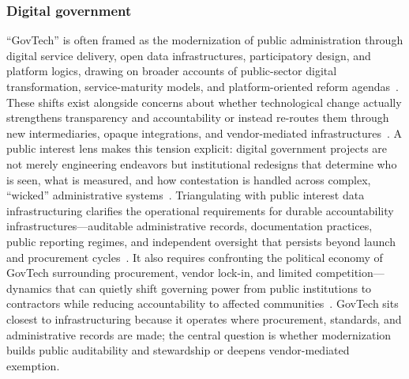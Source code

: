 \documentclass[acmsmall,screen]{acmart}
\begin{document}
\subsubsection*{Digital government}
``GovTech'' is often framed as the modernization of public administration through digital service delivery, open data infrastructures, participatory design, and platform logics, drawing on broader accounts of public-sector digital transformation, service-maturity models, and platform-oriented reform agendas~\cite{eomDigitalGovernmentTransformation2022,layneDevelopingFullyFunctional2001,brownAppraisingImpactRole2017}. These shifts exist alongside concerns about whether technological change actually strengthens transparency and accountability or instead re-routes them through new intermediaries, opaque integrations, and vendor-mediated infrastructures~\cite{bertotUsingICTsCreate2010,bharosaRiseGovTechTrojan2022,silvePoliticalEconomyGovTech2023}. A public interest lens makes this tension explicit: digital government projects are not merely engineering endeavors but institutional redesigns that determine who is seen, what is measured, and how contestation is handled across complex, ``wicked'' administrative systems~\cite{gil-garciaDigitalGovernmentPublic2018,kimDigitalGovernmentWicked2016,twizeyimanaPublicValueEGovernment2019}. Triangulating with public interest data infrastructuring clarifies the operational requirements for durable accountability infrastructures---auditable administrative records, documentation practices, public reporting regimes, and independent oversight that persists beyond launch and procurement cycles~\cite{panagiotopoulosPublicValueCreation2019,zuiderwijkOpenDataPolicies2014b,bertotUsingICTsCreate2010}. It also requires confronting the political economy of GovTech surrounding procurement, vendor lock-in, and limited competition---dynamics that can quietly shift governing power from public institutions to contractors while reducing accountability to affected communities~\cite{silvePoliticalEconomyGovTech2023,bharosaRiseGovTechTrojan2022,brownAppraisingImpactRole2017}. GovTech sits closest to infrastructuring because it operates where procurement, standards, and administrative records are made; the central question is whether modernization builds public auditability and stewardship or deepens vendor-mediated exemption.
\end{document}
